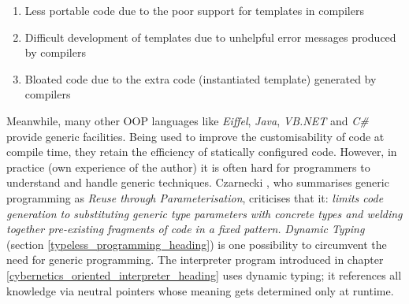 \begin{enumerate}
    \item Less portable code due to the poor support for templates in compilers
    \item Difficult development of templates due to unhelpful error messages
        produced by compilers
    \item Bloated code due to the extra code (instantiated template) generated
        by compilers
\end{enumerate}

Meanwhile, many other OOP languages like \emph{Eiffel}, \emph{Java},
\emph{VB.NET} and \emph{C\#} provide generic facilities. Being used to improve
the customisability of code at compile time, they retain the efficiency of
statically configured code. However, in practice (own experience of the author)
it is often hard for programmers to understand and handle generic techniques.
Czarnecki \cite{czarnecki}, who summarises generic programming as \textit{Reuse
through Parameterisation}, criticises that it: \textit{limits code generation
to substituting generic type parameters with concrete types and welding together
pre-existing fragments of code in a fixed pattern.} \emph{Dynamic Typing}
(section \ref{typeless_programming_heading}) is one possibility to circumvent
the need for generic programming. The interpreter program introduced in chapter
\ref{cybernetics_oriented_interpreter_heading} uses dynamic typing; it
references all knowledge via neutral pointers whose meaning gets determined
only at runtime.
